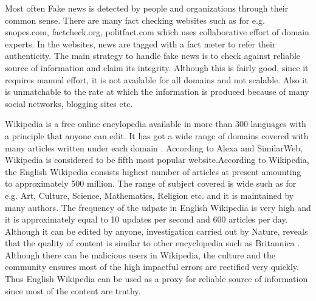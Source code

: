 \documentclass[a4paper, 11pt]{article}
\begin{document}
Most often Fake news is detected by people and organizations through their common sense. There are many fact checking websites such as for e.g. snopes.com, factcheck.org, politfact.com which uses collaborative effort of domain experts. In the websites, news are tagged with a fact meter to refer their authenticity. The main strategy to handle fake news is to check against reliable source of information and claim its integrity. Although this is fairly good, since it requires manual effort, it is not available for all domains and not scalable. Also it is unmatchable to the rate at which the information is produced because of many social networks, blogging sites etc.


 Wikipedia is a free online encylopedia available in more than 300 languages with a principle that anyone can edit. It has got a wide range of domains covered with many articles written under each domain \cite{Wales2005}. According to Alexa and SimilarWeb, Wikipedia is considered to be fifth most popular website.According to Wikipedia, the English Wikipedia consists highest number of articles at present amounting to approximately 500 million. The range of subject covered is wide such as for e.g. Art, Culture, Science, Mathematics, Religion etc. and it is maintained by many authors. The frequency of the udpate in English Wikipedia is very high and it is approximately equal to 10 updates per second and 600 articles per day. Although it can be edited by anyone, investigation carried out by Nature, reveals that the quality of content is similar to other encyclopedia such as Britannica \cite{Wales2005}. Although there can be malicious users in Wikipedia, the culture and the community ensures most of the high impactful errors are rectified very quickly\cite{Priedhorsky2007}. Thus English Wikipedia can be used as a proxy for reliable source of information since most of the content are truthy.
 
\end{document}
